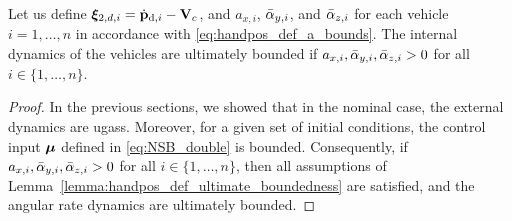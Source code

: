 \begin{prop}
    \label{prop:angular_velocities}
    Let us define $\bm{\xi}_{2, d, i} = \dot{\mathbf{p}}_{{\rm d}, i} - \mathbf{V}_c$, and $a_{x, i}$, $\Bar{\alpha}_{y, i}$, and $\Bar{\alpha}_{z, i}$ for each vehicle $i = 1, \ldots, n$ in accordance with \eqref{eq:handpos_def_a_bounds}.
    The internal dynamics of the vehicles are ultimately bounded if $a_{x, i}, \Bar{\alpha}_{y, i}, \Bar{\alpha}_{z, i} > 0$ for all $i \in \{1, \ldots, n\}$.
\end{prop}

\begin{proof}
    In the previous sections, we showed that in the nominal case, the external dynamics are \glspl{ugas}.
    Moreover, for a given set of initial conditions, the control input $\bm{\mu}$ defined in \eqref{eq:NSB_double} is bounded.
    Consequently, if $a_{x, i}, \Bar{\alpha}_{y, i}, \Bar{\alpha}_{z, i} > 0$ for all $i \in \{1, \ldots, n\}$, then all assumptions of Lemma~\ref{lemma:handpos_def_ultimate_boundedness} are satisfied, and the angular rate dynamics are ultimately bounded.
\end{proof}

